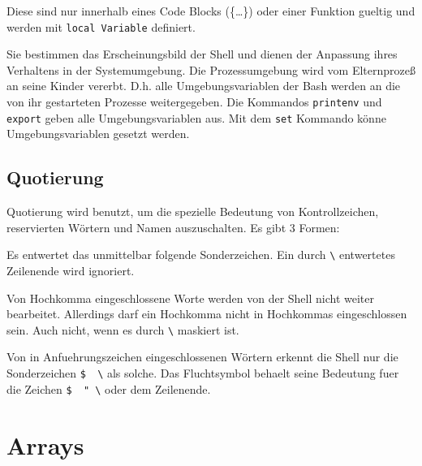 \documentclass[12pt,]{article}
\providecommand{\tightlist}{%
  \setlength{\itemsep}{0pt}\setlength{\parskip}{0pt}}
\begin{document}
\begin{description}
\tightlist
\item[\textbf{local variables}]
Diese sind nur innerhalb eines Code Blocks (\{\ldots{}\}) oder einer
Funktion gueltig und werden mit \texttt{local\ Variable} definiert.
\item[\textbf{environmental variables}]
Sie bestimmen das Erscheinungsbild der Shell und dienen der Anpassung
ihres Verhaltens in der Systemumgebung. Die Prozessumgebung wird vom
Elternprozeß an seine Kinder vererbt. D.h. alle Umgebungsvariablen der
Bash werden an die von ihr gestarteten Prozesse weitergegeben. Die
Kommandos \texttt{printenv} und \texttt{export} geben alle
Umgebungsvariablen aus. Mit dem \texttt{set} Kommando könne
Umgebungsvariablen gesetzt werden.
\end{description}

\subsection{Quotierung}\label{quotierung}

Quotierung wird benutzt, um die spezielle Bedeutung von Kontrollzeichen,
reservierten Wörtern und Namen auszuschalten. Es gibt 3 Formen:

\begin{description}
\tightlist
\item[\textbf{Fluchtsymbol}]
Es entwertet das unmittelbar folgende Sonderzeichen. Ein durch
\texttt{\textbackslash{}} entwertetes Zeilenende wird ignoriert.
\item[\textbf{Hochkomma \texttt{\textquotesingle{}} (Quote)}]
Von Hochkomma eingeschlossene Worte werden von der Shell nicht weiter
bearbeitet. Allerdings darf ein Hochkomma nicht in Hochkommas
eingeschlossen sein. Auch nicht, wenn es durch \texttt{\textbackslash{}}
maskiert ist.
\item[\textbf{Anfuehrungszeichen \texttt{"} ~(Doublequotes)}]
Von in Anfuehrungszeichen eingeschlossenen Wörtern erkennt die Shell nur
die Sonderzeichen \texttt{\$\ \textquotesingle{}\ \textbackslash{}} als
solche. Das Fluchtsymbol behaelt seine Bedeutung fuer die Zeichen
\texttt{\$\ \textquotesingle{}\ "\ \textbackslash{}} oder dem
Zeilenende.
\end{description}

\section{Arrays}\label{arrays}
\end{document}
